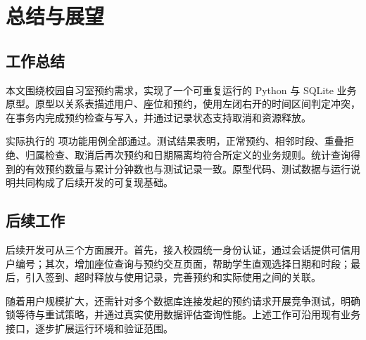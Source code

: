 \chapter{总结与展望}
\section{工作总结}
本文围绕校园自习室预约需求，实现了一个可重复运行的 Python 与 SQLite 业务原型。原型以关系表描述用户、座位和预约，使用左闭右开的时间区间判定冲突，在事务内完成预约检查与写入，并通过记录状态支持取消和资源释放。

实际执行的 \SampleTestCount{} 项功能用例全部通过。测试结果表明，正常预约、相邻时段、重叠拒绝、归属检查、取消后再次预约和日期隔离均符合所定义的业务规则。统计查询得到的有效预约数量与累计分钟数也与测试记录一致。原型代码、测试数据与运行说明共同构成了后续开发的可复现基础。

\section{后续工作}
后续开发可从三个方面展开。首先，接入校园统一身份认证，通过会话提供可信用户编号；其次，增加座位查询与预约交互页面，帮助学生直观选择日期和时段；最后，引入签到、超时释放与使用记录，完善预约和实际使用之间的关联。

随着用户规模扩大，还需针对多个数据库连接发起的预约请求开展竞争测试，明确锁等待与重试策略，并通过真实使用数据评估查询性能。上述工作可沿用现有业务接口，逐步扩展运行环境和验证范围。
